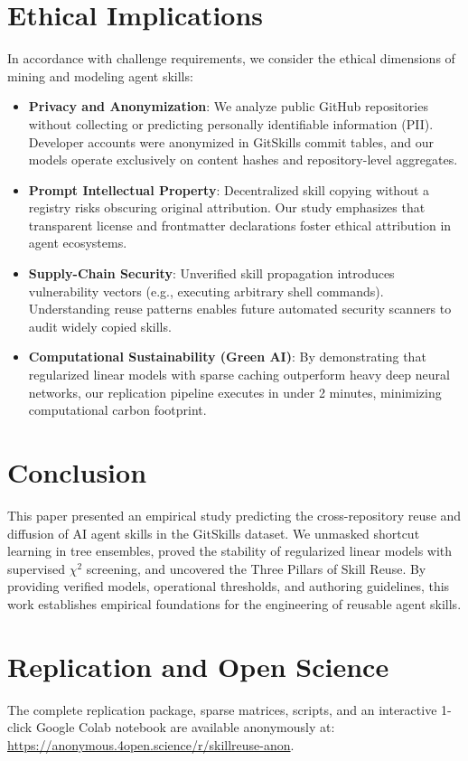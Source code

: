 \documentclass[10pt,conference]{IEEEtran}
\begin{document}
\section{Ethical Implications}
In accordance with challenge requirements, we consider the ethical dimensions of mining and modeling agent skills:
\begin{itemize}
    \item \textbf{Privacy and Anonymization}: We analyze public GitHub repositories without collecting or predicting personally identifiable information (PII). Developer accounts were anonymized in GitSkills commit tables, and our models operate exclusively on content hashes and repository-level aggregates.
    \item \textbf{Prompt Intellectual Property}: Decentralized skill copying without a registry risks obscuring original attribution. Our study emphasizes that transparent license and frontmatter declarations foster ethical attribution in agent ecosystems.
    \item \textbf{Supply-Chain Security}: Unverified skill propagation introduces vulnerability vectors (e.g., executing arbitrary shell commands). Understanding reuse patterns enables future automated security scanners to audit widely copied skills.
    \item \textbf{Computational Sustainability (Green AI)}: By demonstrating that regularized linear models with sparse caching outperform heavy deep neural networks, our replication pipeline executes in under 2 minutes, minimizing computational carbon footprint.
\end{itemize}

\section{Conclusion}
This paper presented an empirical study predicting the cross-repository reuse and diffusion of AI agent skills in the GitSkills dataset. We unmasked shortcut learning in tree ensembles, proved the stability of regularized linear models with supervised $\chi^2$ screening, and uncovered the Three Pillars of Skill Reuse. By providing verified models, operational thresholds, and authoring guidelines, this work establishes empirical foundations for the engineering of reusable agent skills.

\section*{Replication and Open Science}
The complete replication package, sparse matrices, scripts, and an interactive 1-click Google Colab notebook are available anonymously at: \url{https://anonymous.4open.science/r/skillreuse-anon}.



\end{document}
